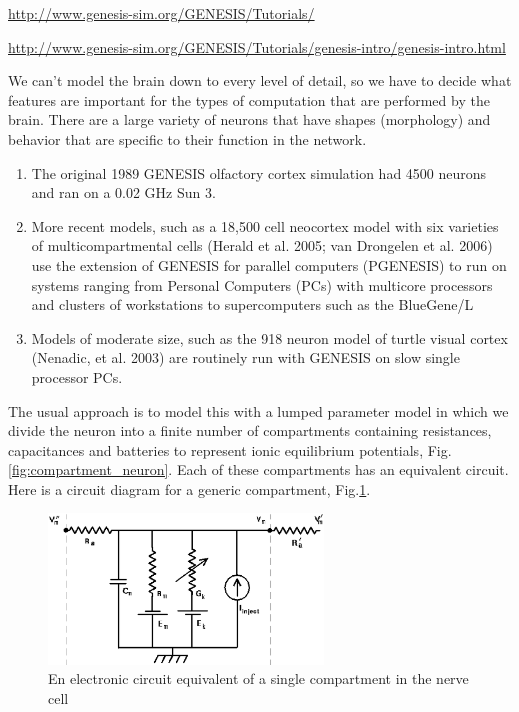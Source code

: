 \url{http://www.genesis-sim.org/GENESIS/Tutorials/}

\url{http://www.genesis-sim.org/GENESIS/Tutorials/genesis-intro/genesis-intro.html}


We can't model the brain down to every level of detail, so we have to decide
what features are important for the types of computation that are performed by the brain. 
There are a large variety of neurons that have shapes (morphology) and behavior
that are specific to their function in the network. 

\begin{enumerate}
  \item The original 1989 GENESIS olfactory cortex simulation had 4500 neurons
  and ran on a 0.02 GHz Sun 3.
  
  \item More recent models, such as a 18,500 cell neocortex model with six
  varieties of multicompartmental cells (Herald et al. 2005; van Drongelen et
  al. 2006) use the extension of GENESIS for parallel computers (PGENESIS) to
  run on systems ranging from Personal Computers (PCs) with multicore processors
  and clusters of workstations to supercomputers such as the BlueGene/L
  
  \item Models of moderate size, such as the 918 neuron model of turtle visual
  cortex (Nenadic, et al. 2003) are routinely run with GENESIS on slow single
  processor PCs.
\end{enumerate}

The usual approach is to model this with a lumped
parameter model in which we divide the neuron into a finite number of
compartments containing resistances, capacitances and batteries to represent
ionic equilibrium potentials, Fig.\ref{fig:compartment_neuron}.
Each of these compartments has an equivalent circuit. Here is a circuit diagram
for a generic compartment, Fig.\ref{fig:one_compartment_neuron}.

\begin{figure}[hbt]
  \centerline{\includegraphics[height=4cm,
    angle=0]{./images/one_compartment_neuron.eps}}
\caption{En electronic circuit equivalent of a single compartment in the nerve
cell}
\label{fig:one_compartment_neuron}
\end{figure}


